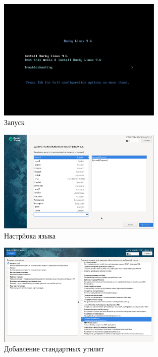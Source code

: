 \documentclass[
  12pt,
  a4paper,
  DIV=11,
  numbers=noendperiod]{scrreprt}
\begin{document}
\begin{figure}

{\centering \includegraphics[width=0.7\textwidth,height=\textheight]{image/4.png}

}

\caption{Запуск}

\end{figure}%
\begin{figure}

{\centering \includegraphics[width=0.7\textwidth,height=\textheight]{image/5.png}

}

\caption{Настрйока языка}

\end{figure}%
\begin{figure}

{\centering \includegraphics[width=0.7\textwidth,height=\textheight]{image/6.png}

}

\caption{Добавление стандартных утилит}

\end{figure}%
\end{document}
